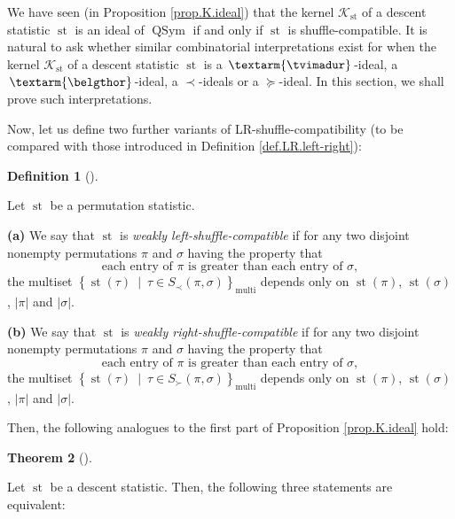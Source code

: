 \documentclass[numbers=enddot,12pt,final,onecolumn,notitlepage]{scrartcl}%
\theoremstyle{definition}
\newtheorem{theo}{Theorem}[section]
\newenvironment{theorem}[1][]
{\begin{theo}[#1]\begin{leftbar}}
{\end{leftbar}\end{theo}}
\newtheorem{defi}[theo]{Definition}
\newenvironment{definition}[1][]
{\begin{defi}[#1]\begin{leftbar}}
{\end{leftbar}\end{defi}}
\newenvironment{verlong}{}{}
\newcommand{\tvi}{\left. \textarm{\tvimadur} \right.}
\newcommand{\bel}{\left. \textarm{\belgthor} \right.}
\begin{document}
\begin{verlong}
We have seen (in Proposition \ref{prop.K.ideal}) that the kernel
$\mathcal{K}_{\operatorname*{st}}$ of a descent statistic $\operatorname*{st}$
is an ideal of $\operatorname*{QSym}$ if and only if $\operatorname*{st}$ is
shuffle-compatible. It is natural to ask whether similar combinatorial
interpretations exist for when the kernel $\mathcal{K}_{\operatorname*{st}}$
of a descent statistic $\operatorname*{st}$ is a $\tvi$-ideal, a $\bel$-ideal,
a $\left.  \prec\right.  $-ideals or a $\left.  \succeq\right.  $-ideal. In
this section, we shall prove such interpretations.

Now, let us define two further variants of LR-shuffle-compatibility (to be
compared with those introduced in Definition \ref{def.LR.left-right}):

\begin{definition}
Let $\operatorname*{st}$ be a permutation statistic.

\textbf{(a)} We say that $\operatorname*{st}$ is \textit{weakly
left-shuffle-compatible} if for any two disjoint nonempty permutations $\pi$
and $\sigma$ having the property that%
\begin{equation}
\text{each entry of }\pi\text{ is greater than each entry of }\sigma,
\label{eq.def.dendri.dsc.weak-ass}%
\end{equation}
the multiset $\left\{  \operatorname*{st}\left(  \tau\right)  \ \mid\ \tau\in
S_{\prec}\left(  \pi,\sigma\right)  \right\}  _{\operatorname*{multi}}$
depends only on $\operatorname*{st}\left(  \pi\right)  $, $\operatorname*{st}%
\left(  \sigma\right)  $, $\left\vert \pi\right\vert $ and $\left\vert
\sigma\right\vert $.

\textbf{(b)} We say that $\operatorname*{st}$ is \textit{weakly
right-shuffle-compatible} if for any two disjoint nonempty permutations $\pi$
and $\sigma$ having the property that%
\[
\text{each entry of }\pi\text{ is greater than each entry of }\sigma,
\]
the multiset $\left\{  \operatorname*{st}\left(  \tau\right)  \ \mid\ \tau\in
S_{\succ}\left(  \pi,\sigma\right)  \right\}  _{\operatorname*{multi}}$
depends only on $\operatorname*{st}\left(  \pi\right)  $, $\operatorname*{st}%
\left(  \sigma\right)  $, $\left\vert \pi\right\vert $ and $\left\vert
\sigma\right\vert $.
\end{definition}

Then, the following analogues to the first part of Proposition
\ref{prop.K.ideal} hold:

\begin{theorem}
\label{thm.dendri.K.ideal}Let $\operatorname*{st}$ be a descent statistic.
Then, the following three statements are equivalent:


\end{theorem}
\end{verlong}
\end{document}
